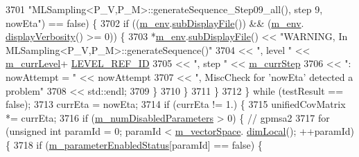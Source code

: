 \begin{DoxyCode}
3701                                                 \textcolor{stringliteral}{"MLSampling<P\_V,P\_M>::generateSequence\_Step09\_all(), step
       9, nowEta"}) == \textcolor{keyword}{false}) \{
3702             \textcolor{keywordflow}{if} ((\hyperlink{class_q_u_e_s_o_1_1_m_l_sampling_a13f1ca4fe9f94822fe572a743eaced1d}{m\_env}.\hyperlink{class_q_u_e_s_o_1_1_base_environment_a8a0064746ae8dddfece4229b9ad374d6}{subDisplayFile}()) && (\hyperlink{class_q_u_e_s_o_1_1_m_l_sampling_a13f1ca4fe9f94822fe572a743eaced1d}{m\_env}.
      \hyperlink{class_q_u_e_s_o_1_1_base_environment_a1fe5f244fc0316a0ab3e37463f108b96}{displayVerbosity}() >= 0)) \{
3703               *\hyperlink{class_q_u_e_s_o_1_1_m_l_sampling_a13f1ca4fe9f94822fe572a743eaced1d}{m\_env}.\hyperlink{class_q_u_e_s_o_1_1_base_environment_a8a0064746ae8dddfece4229b9ad374d6}{subDisplayFile}() << \textcolor{stringliteral}{"WARNING, In
       MLSampling<P\_V,P\_M>::generateSequence()"}
3704                                       << \textcolor{stringliteral}{", level "}        << \hyperlink{class_q_u_e_s_o_1_1_m_l_sampling_af9416874c856e50f3b35270e801f17e4}{m\_currLevel}+
      \hyperlink{_m_l_sampling_level_options_8h_a68d15eaf394d210effcf584b938206d3}{LEVEL\_REF\_ID}
3705                                       << \textcolor{stringliteral}{", step "}         << \hyperlink{class_q_u_e_s_o_1_1_m_l_sampling_a1b1f8ccb4823bdfa26ec652f0807c63e}{m\_currStep}
3706                                       << \textcolor{stringliteral}{": nowAttempt = "} << nowAttempt
3707                                       << \textcolor{stringliteral}{", MiscCheck for 'nowEta' detected a problem"}
3708                                       << std::endl;
3709             \}
3710           \}
3711         \}
3712       \} \textcolor{keywordflow}{while} (testResult == \textcolor{keyword}{false});
3713       currEta = nowEta;
3714       \textcolor{keywordflow}{if} (currEta != 1.) \{
3715         unifiedCovMatrix *= currEta;
3716         \textcolor{keywordflow}{if} (\hyperlink{class_q_u_e_s_o_1_1_m_l_sampling_afbe27e6149562020663b72da6592d933}{m\_numDisabledParameters} > 0) \{ \textcolor{comment}{// gpmsa2}
3717           \textcolor{keywordflow}{for} (\textcolor{keywordtype}{unsigned} \textcolor{keywordtype}{int} paramId = 0; paramId < \hyperlink{class_q_u_e_s_o_1_1_m_l_sampling_a7bc4c72f65ba9166ed94a6e198b0915b}{m\_vectorSpace}.
      \hyperlink{class_q_u_e_s_o_1_1_vector_space_a5829a1f4f996f8307c840b705144d666}{dimLocal}(); ++paramId) \{
3718             \textcolor{keywordflow}{if} (\hyperlink{class_q_u_e_s_o_1_1_m_l_sampling_ac76690384f70d74b8662faf7a051449e}{m\_parameterEnabledStatus}[paramId] == \textcolor{keyword}{false}) \{

\end{DoxyCode}
